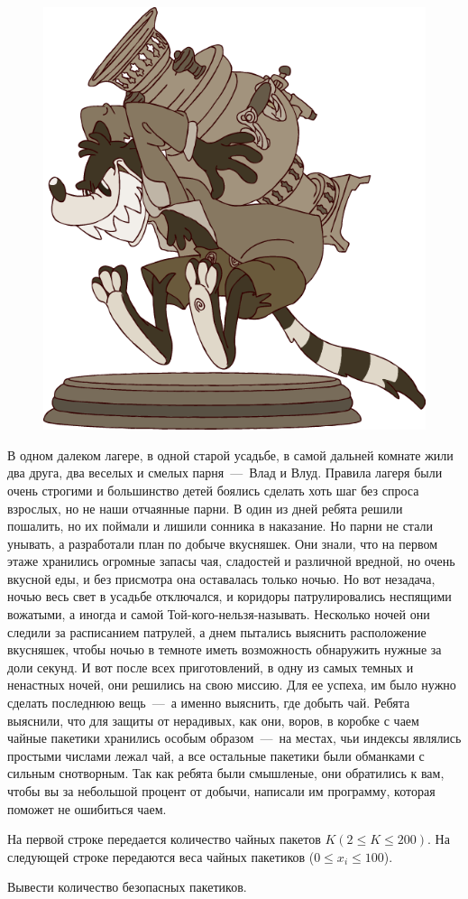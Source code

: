 \begin{figure}[h!]
	\centering
	\includegraphics[width=0.4\linewidth, keepaspectratio]{tea_thief.png}
\end{figure}

В одном далеком лагере, в одной старой усадьбе, в самой дальней комнате жили два друга, два веселых и смелых парня~---~Влад и Влуд. 
Правила лагеря были очень строгими и большинство детей боялись сделать хоть шаг без спроса взрослых, но не наши отчаянные парни. 
В один из дней ребята решили пошалить, но их поймали и лишили сонника в наказание. 
Но парни не стали унывать, а разработали план по добыче вкусняшек. 
Они знали, что на первом этаже хранились огромные запасы чая, сладостей и различной вредной, но очень вкусной еды, и без присмотра она оставалась только ночью. 
Но вот незадача, ночью весь свет в усадьбе отключался, и коридоры патрулировались неспящими вожатыми, а иногда и самой Той-кого-нельзя-называть.  
Несколько ночей они следили за расписанием патрулей, а днем  пытались выяснить расположение вкусняшек, чтобы ночью в темноте иметь возможность обнаружить нужные за доли секунд.
И вот после всех приготовлений, в одну из самых темных и ненастных ночей, они решились на свою миссию. 
Для ее успеха, им было нужно сделать последнюю вещь~---~а именно выяснить, где добыть чай. 
Ребята выяснили, что для защиты от нерадивых, как они, воров, в коробке с чаем чайные пакетики хранились особым образом~---~на местах, чьи индексы являлись простыми числами лежал чай, 
а все остальные пакетики были обманками с сильным снотворным. 
Так как ребята были смышленые, они обратились к вам, чтобы вы за небольшой процент от добычи, написали им программу, которая поможет не ошибиться чаем.

\InputFile
\noindent

На первой строке передается количество чайных пакетов $K (2 \leq K \leq 200)$.
На следующей строке передаются веса чайных пакетиков ($0 \leq x_i \leq 100$).


\OutputFile
\noindent

Вывести количество безопасных пакетиков.

\SAMPLES